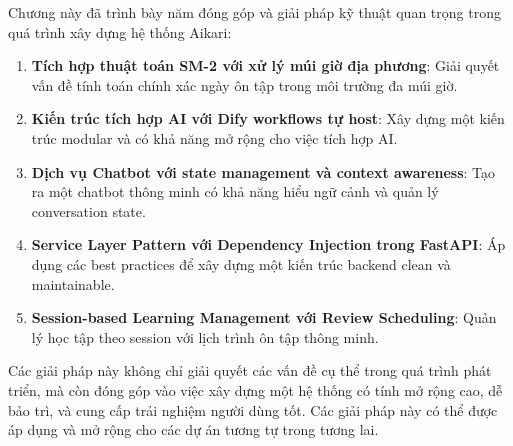 \documentclass[../DoAn.tex]{subfiles}
\begin{document}
Chương này đã trình bày năm đóng góp và giải pháp kỹ thuật quan trọng trong quá trình xây dựng hệ thống Aikari:

\begin{enumerate}
    \item \textbf{Tích hợp thuật toán SM-2 với xử lý múi giờ địa phương}: Giải quyết vấn đề tính toán chính xác ngày ôn tập trong môi trường đa múi giờ.
    
    \item \textbf{Kiến trúc tích hợp AI với Dify workflows tự host}: Xây dựng một kiến trúc modular và có khả năng mở rộng cho việc tích hợp AI.
    
    \item \textbf{Dịch vụ Chatbot với state management và context awareness}: Tạo ra một chatbot thông minh có khả năng hiểu ngữ cảnh và quản lý conversation state.
    
    \item \textbf{Service Layer Pattern với Dependency Injection trong FastAPI}: Áp dụng các best practices để xây dựng một kiến trúc backend clean và maintainable.
    
    \item \textbf{Session-based Learning Management với Review Scheduling}: Quản lý học tập theo session với lịch trình ôn tập thông minh.
\end{enumerate}

Các giải pháp này không chỉ giải quyết các vấn đề cụ thể trong quá trình phát triển, mà còn đóng góp vào việc xây dựng một hệ thống có tính mở rộng cao, dễ bảo trì, và cung cấp trải nghiệm người dùng tốt. Các giải pháp này có thể được áp dụng và mở rộng cho các dự án tương tự trong tương lai.
\end{document}
